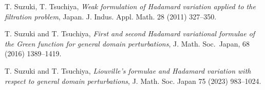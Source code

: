 \documentclass[final,a4paper]{jmsj}
\theoremstyle{thmstyleone}%
\theoremstyle{thmstyletwo}%
\theoremstyle{thmstylethree}%
\begin{document}
\begin{thebibliography}{9}
T. Suzuki, T. Tsuchiya,
{\it Weak formulation of Hadamard variation applied to the filtration problem},
Japan. J. Indus. Appl. Math. 28 (2011) 327--350.


T. Suzuki and T. Tsuchiya,
{\it First and second Hadamard variational formulae of the Green
function for general domain perturbations}, 
J. Math. Soc.\ Japan,
68  %
(2016)       %
1389--1419.      %


T. Suzuki and T. Tsuchiya,
{\it Liouville's formulae and Hadamard variation with respect to general domain perturbations}, 
J. Math. Soc. Japan
75  %
(2023)  %
983--1024.  %

\end{thebibliography}
\end{document}
